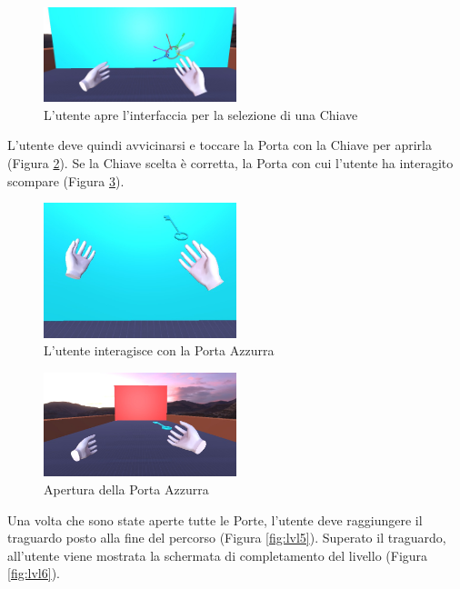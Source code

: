 \documentclass[target=bach,aauheader=]{thud}
\begin{document}
\begin{figure}[h]
    \centering
    \includegraphics[width=0.50\textwidth]{lvl2}
    \caption{L'utente apre l'interfaccia per la selezione di una Chiave }
    \label{fig:lvl2}
\end{figure}

L'utente deve quindi avvicinarsi e toccare la Porta con la Chiave per aprirla (Figura \ref{fig:lvl3}).
Se la Chiave scelta è corretta, la Porta con cui l'utente ha interagito scompare (Figura \ref{fig:lvl4}). \\

\begin{figure}[h]
    \centering
    \includegraphics[width=0.50\textwidth]{lvl3}
    \caption{L'utente interagisce con la Porta Azzurra}
    \label{fig:lvl3}
\end{figure}

\begin{figure}[h]
    \centering
    \includegraphics[width=0.50\textwidth]{lvl4}
    \caption{Apertura della Porta Azzurra}
    \label{fig:lvl4}
\end{figure}

\newpage
Una volta che sono state aperte tutte le Porte, l'utente deve raggiungere il traguardo posto alla fine del percorso (Figura \ref{fig:lvl5}).
Superato il traguardo, all'utente viene mostrata la schermata di completamento del livello (Figura \ref{fig:lvl6}). \\
\end{document}
